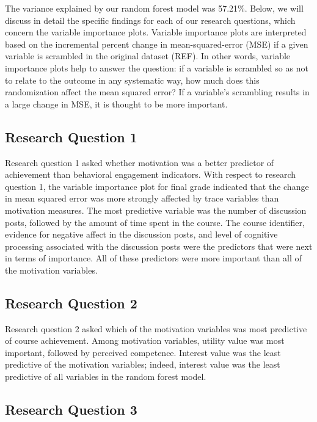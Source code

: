 \documentclass[acmart]{apa6}
\theoremstyle{definition}
\theoremstyle{definition}
\theoremstyle{definition}
\theoremstyle{remark}
\begin{document}
The variance explained by our random forest model was 57.21\%. Below, we
will discuss in detail the specific findings for each of our research
questions, which concern the variable importance plots. Variable
importance plots are interpreted based on the incremental percent change
in mean-squared-error (MSE) if a given variable is scrambled in the
original dataset (REF). In other words, variable importance plots help
to answer the question: if a variable is scrambled so as not to relate
to the outcome in any systematic way, how much does this randomization
affect the mean squared error? If a variable's scrambling results in a
large change in MSE, it is thought to be more important.

\subsection{Research Question 1}\label{research-question-1}

Research question 1 asked whether motivation was a better predictor of
achievement than behavioral engagement indicators. With respect to
research question 1, the variable importance plot for final grade
indicated that the change in mean squared error was more strongly
affected by trace variables than motivation measures. The most
predictive variable was the number of discussion posts, followed by the
amount of time spent in the course. The course identifier, evidence for
negative affect in the discussion posts, and level of cognitive
processing associated with the discussion posts were the predictors that
were next in terms of importance. All of these predictors were more
important than all of the motivation variables.

\subsection{Research Question 2}\label{research-question-2}

Research question 2 asked which of the motivation variables was most
predictive of course achievement. Among motivation variables, utility
value was most important, followed by perceived competence. Interest
value was the least predictive of the motivation variables; indeed,
interest value was the least predictive of all variables in the random
forest model.

\subsection{Research Question 3}\label{research-question-3}
\end{document}
